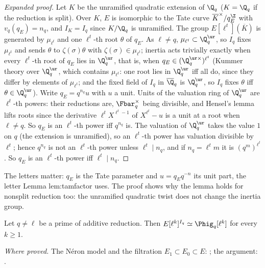\begin{sloppypar}
\begin{proof}[Expanded proof]
Let $K$ be the unramified quadratic extension of $\Q_q$ ($K=\Q_q$ if the reduction is split). Over $K$, $E$ is isomorphic to the Tate curve $\overline K^\times/q_E^{\Z}$ with
$v_q(q_E)=n_q$, and $I_K=I_q$ since $K/\Q_q$ is unramified. The group $E[\ell^t](\overline K)$ is generated by $\mu_{\ell^t}$ and one $\ell^t$-th root $\theta$ of $q_E$. As $\ell\ne q$,
$\mu_{\ell^t}\subset\Q_q^{\ur}$, so $I_q$ fixes $\mu_{\ell^t}$ and sends $\theta$ to $\zeta(\sigma)\theta$ with $\zeta(\sigma)\in\mu_{\ell^t}$; inertia acts trivially exactly when every $\ell^t$-th root of
$q_E$ lies in $\Q_q^{\ur}$, that is, when $q_E\in(\Q_q^{\ur\times})^{\ell^t}$ (Kummer theory over $\Q_q^{\ur}$, which contains $\mu_{\ell^t}$: one root lies in $\Q_q^{\ur}$ iff all do, since
they differ by elements of $\mu_{\ell^t}$; and the fixed field of $I_q$ in $\overline\Q_q$ is $\Q_q^{\ur}$, so $I_q$ fixes $\theta$ iff $\theta\in\Q_q^{\ur}$). Write $q_E=q^{n_q}u$ with $u$ a unit. Units of the
valuation ring of $\Q_q^{\ur}$ are $\ell^t$-th powers: their reductions are, $\Fbar_q^\times$ being divisible, and Hensel's lemma lifts roots since the derivative $\ell^tX^{\ell^t-1}$ of $X^{\ell^t}-u$ is a
unit at a root when $\ell\ne q$. So $q_E$ is an $\ell^t$-th power iff $q^{n_q}$ is. The valuation of $\Q_q^{\ur}$ takes the value $1$ on $q$ (the extension is unramified), so an $\ell^t$-th power
has valuation divisible by $\ell^t$; hence $q^{n_q}$ is not an $\ell^t$-th power unless $\ell^t\mid n_q$, and if $n_q=\ell^tm$ it is $(q^m)^{\ell^t}$. So $q_E$ is an $\ell^t$-th power iff $\ell^t\mid n_q$.
\end{proof}

\noindent The letters matter: $q_E$ is the Tate parameter and $u=q_Eq^{-n}$ its unit part, the letter Lemma lem:tamfactor uses. The proof shows why the lemma holds for
nonsplit reduction too: the unramified quadratic twist does not change the inertia group.

\begin{lemma}\label{lem:paper:inertia-invariants}
Let $q\ne\ell$ be a prime of additive reduction. Then $E[\ell^k]^{I_q}\simeq\Phig_q[\ell^k]$ for every $k\ge1$.
\end{lemma}

\noindent\emph{Where proved.} The N\'eron model and the filtration $E_1\subset E_0\subset E$: ; the argument: .


\end{sloppypar}
